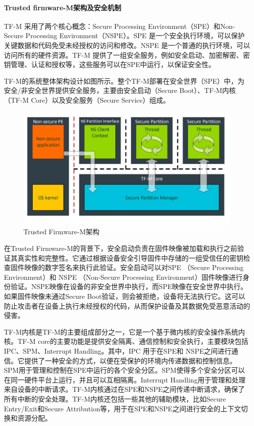 \documentclass[12pt,a4paper]{ctexart}
\begin{document}
\paragraph{Trusted firmware-M架构及安全机制}
\par TF-M 采用了两个核心概念：Secure Processing Environment（SPE）和Non-Secure Processing Environment（NSPE）。SPE 是一个安全执行环境，可以保护关键数据和代码免受未经授权的访问和修改。NSPE 是一个普通的执行环境，可以访问所有的硬件资源。TF-M 提供了一组安全服务，例如安全启动、加密解密、密钥管理、认证和授权等，这些服务可以在SPE中运行，以保证安全性。
\par TF-M的系统整体架构设计如图所示。整个TF-M部署在安全世界（SPE）中，为安全/非安全世界提供安全服务，主要由安全启动（Secure Boot）、TF-M内核（TF-M Core）以及安全服务（Secure Service）组成。
\begin{figure}[h]
    \centering
    \includegraphics[scale=0.5]{graph/1.jpg}
    \caption{Trusted Firmware-M架构}
\end{figure}
\par 在Trusted Firmware-M的背景下，安全启动负责在固件映像被加载和执行之前验证其真实性和完整性。它通过根据设备安全引导固件中存储的一组受信任的密钥检查固件映像的数字签名来执行此验证。安全启动可以对SPE （Secure Processing Environment）和 NSPE （Non-Secure Processing Environment）固件映像进行身份验证。NSPE映像在设备的非安全世界中执行，而SPE映像在安全世界中执行。如果固件映像未通过Secure Boot验证，则会被拒绝，设备将无法执行它。这可以防止攻击者在设备上执行未经授权的代码，从而保护设备及其数据免受恶意活动的侵害。
\par TF-M内核是TF-M的主要组成部分之一，它是一个基于微内核的安全操作系统内核。TF-M core的主要功能是提供安全隔离、通信控制和安全执行，主要模块包括IPC、SPM、Interrupt Handling。其中，IPC 用于在SPE和 NSPE之间进行通信。它提供了一种安全的方式，以便在受保护的环境内传递数据和控制信息。SPM用于管理和控制在SPE中运行的各个安全分区。SPM使得多个安全分区可以在同一硬件平台上运行，并且可以互相隔离。Interrupt Handling用于管理和处理来自设备的中断请求。TF-M内核通过在SPE和NSPE之间传递中断请求，确保了所有中断的安全处理。TF-M内核还包括一些其他的辅助模块，比如Secure Entry/Exit和Secure Attribution等，用于在SPE和NSPE之间进行安全的上下文切换和资源分配。
\end{document}
